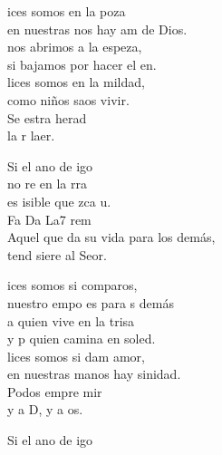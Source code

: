 \documentclass[12pt]{article}
\begin{document}
\begin{multicols*}{2}
\begin{cancion}[Bienaventuranzas][Kairoi]%
	ices somos en la poza\\
	en nuestras nos hay am de Dios.\\
	nos abrimos a la espeza,\\
	si bajamos por hacer el en.\\
	lices somos en la mildad,\\
	como niños saos vivir.\\
	Se estra herad\\
	la r laer.\\
	\begin{chorus}%
	Si el ano de igo \\
	no re en la rra\\
	es isible que zca u.\\
  Fa      Da    La7       rem\\
Aquel que da su vida para los demás,\\
	tend siere al Seor.\\
	\end{chorus}%
	ices somos si comparos,\\
	nuestro empo es para s demás\\
	a quien vive en la trisa\\
	y p quien camina en soled.\\
	lices somos si dam amor,\\
	en nuestras manos hay sinidad.\\
	Podos empre mir\\
	y  a D, y  a os.\\
	\begin{chorus}%
	Si el ano de igo \\

\end{chorus}
\end{cancion}
\end{multicols*}
\end{document}
